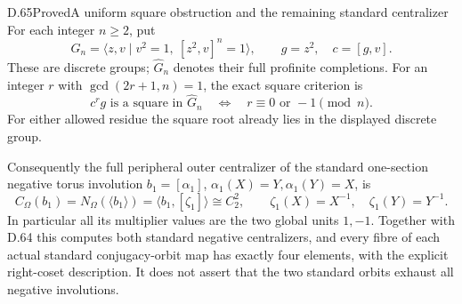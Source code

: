 \begin{claim}{D.65}{Proved}{A uniform square obstruction and the remaining standard centralizer}
For each integer $n\geq2$, put
\[
 G_n=\langle z,v\mid v^2=1,\ [z^2,v]^n=1\rangle,\qquad
 g=z^2,\quad c=[g,v].
                                                               \tag{D.65a}
\]
These are discrete groups; $\widehat G_n$ denotes their
full profinite completions.
For an integer $r$ with $\gcd(2r+1,n)=1$, the exact
square criterion is
\[
 c^rg\text{ is a square in }\widehat G_n
       \quad\Longleftrightarrow\quad
                  r\equiv0\text{ or }-1\pmod n.              \tag{D.65b}
\]
For either allowed residue the square root already
lies in the displayed discrete group.

Consequently the full peripheral outer centralizer
of the standard one-section negative torus involution
$b_1=[\alpha_1]$, $\alpha_1(X)=Y,\alpha_1(Y)=X$, is
\[
 C_\Omega(b_1)=N_\Omega(\langle b_1\rangle)
       =\langle b_1,[\zeta_1]\rangle\cong C_2^2,\qquad
       \zeta_1(X)=X^{-1},\quad\zeta_1(Y)=Y^{-1}.
                                                               \tag{D.65c}
\]
In particular all its multiplier values are the two
global units $1,-1$. Together with D.64 this computes
both standard negative centralizers, and every fibre
of each actual standard conjugacy-orbit map has exactly
four elements, with the explicit right-coset description.
It does not assert that the two standard orbits exhaust
all negative involutions.
\end{claim}

